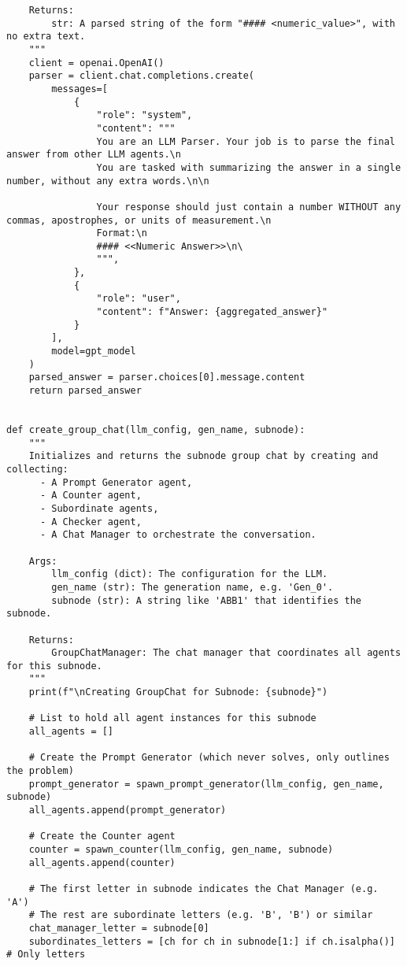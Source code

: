 \begin{lstlisting}
    Returns:
        str: A parsed string of the form "#### <numeric_value>", with no extra text.
    """
    client = openai.OpenAI()
    parser = client.chat.completions.create(
        messages=[
            {
                "role": "system",
                "content": """
                You are an LLM Parser. Your job is to parse the final answer from other LLM agents.\n
                You are tasked with summarizing the answer in a single number, without any extra words.\n\n

                Your response should just contain a number WITHOUT any commas, apostrophes, or units of measurement.\n
                Format:\n
                #### <<Numeric Answer>>\n\
                """,
            },
            {
                "role": "user",
                "content": f"Answer: {aggregated_answer}"
            }
        ],
        model=gpt_model
    )
    parsed_answer = parser.choices[0].message.content
    return parsed_answer


def create_group_chat(llm_config, gen_name, subnode):
    """
    Initializes and returns the subnode group chat by creating and collecting:
      - A Prompt Generator agent,
      - A Counter agent,
      - Subordinate agents,
      - A Checker agent,
      - A Chat Manager to orchestrate the conversation.

    Args:
        llm_config (dict): The configuration for the LLM.
        gen_name (str): The generation name, e.g. 'Gen_0'.
        subnode (str): A string like 'ABB1' that identifies the subnode.

    Returns:
        GroupChatManager: The chat manager that coordinates all agents for this subnode.
    """
    print(f"\nCreating GroupChat for Subnode: {subnode}")

    # List to hold all agent instances for this subnode
    all_agents = []

    # Create the Prompt Generator (which never solves, only outlines the problem)
    prompt_generator = spawn_prompt_generator(llm_config, gen_name, subnode)
    all_agents.append(prompt_generator)

    # Create the Counter agent
    counter = spawn_counter(llm_config, gen_name, subnode)
    all_agents.append(counter)

    # The first letter in subnode indicates the Chat Manager (e.g. 'A')
    # The rest are subordinate letters (e.g. 'B', 'B') or similar
    chat_manager_letter = subnode[0]
    subordinates_letters = [ch for ch in subnode[1:] if ch.isalpha()]  # Only letters


\end{lstlisting}
